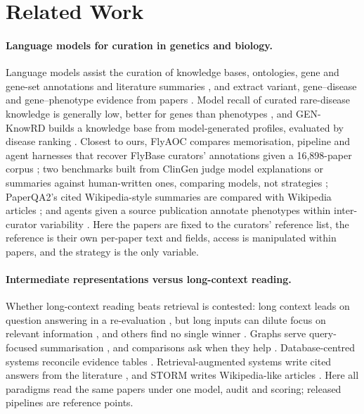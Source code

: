 \documentclass{article} %
\begin{document}
\section{Related Work}
\label{sec:related_work}
\paragraph{Language models for curation in genetics and biology.}
Language models assist the curation of knowledge bases, ontologies, gene and gene-set annotations and literature summaries \citep{caufield2024structured,caufield2024curategpt,toro2024dynamic,Li2025GenewhispererEnhancing,hu2025evaluation,niyonkuru2025leveraging,Green2026GoflowllmcuratingMirna,Murphy2024HarnessingGenerative,Green2023LitsummLarge}, and extract variant, gene--disease and gene--phenotype evidence from papers \citep{li2025autopm3,furlan2025eagleai,wang2026pubmind,yin2026benchmarking,twede2026evidence}. Model recall of curated rare-disease knowledge is generally low, better for genes than phenotypes \citep{groza2026systematic}, and GEN-KnowRD builds a knowledge base from model-generated profiles, evaluated by disease ranking \citep{yan2026genknowrd}. Closest to ours, FlyAOC compares memorisation, pipeline and agent harnesses that recover FlyBase curators' annotations given a 16,898-paper corpus \citep{zhang2026flyaoc}; two benchmarks built from ClinGen judge model explanations or summaries against human-written ones, comparing models, not strategies \citep{queen2025cgbench,Saadat2026LargeLanguage}; PaperQA2's cited Wikipedia-style summaries are compared with Wikipedia articles \citep{skarlinski2024language}; and agents given a source publication annotate phenotypes within inter-curator variability \citep{balhoff2026frontier}. Here the papers are fixed to the curators' reference list, the reference is their own per-paper text and fields, access is manipulated within papers, and the strategy is the only variable.

\paragraph{Intermediate representations versus long-context reading.}
Whether long-context reading beats retrieval is contested: long context leads on question answering in a re-evaluation \citep{Li2024LongContext}, but long inputs can dilute focus on relevant information \citep{Yu2024DefenseRag,liu2024lost,Zhang2024ChainAgents}, and others find no single winner \citep{Li2025LaraBenchmarking}. Graphs serve query-focused summarisation \citep{edge2024local}, and comparisons ask when they help \citep{han2025rag,xiang2025use}. Database-centred systems reconcile evidence tables \citep{joshi2026sliders}. Retrieval-augmented systems write cited answers from the literature \citep{Lla2023PaperqaRetrievalaugmented,Asai2024OpenscholarSynthesizing,singh2025ai2}, and STORM writes Wikipedia-like articles \citep{shao2024assisting}. Here all paradigms read the same papers under one model, audit and scoring; released pipelines are reference points.
\end{document}
